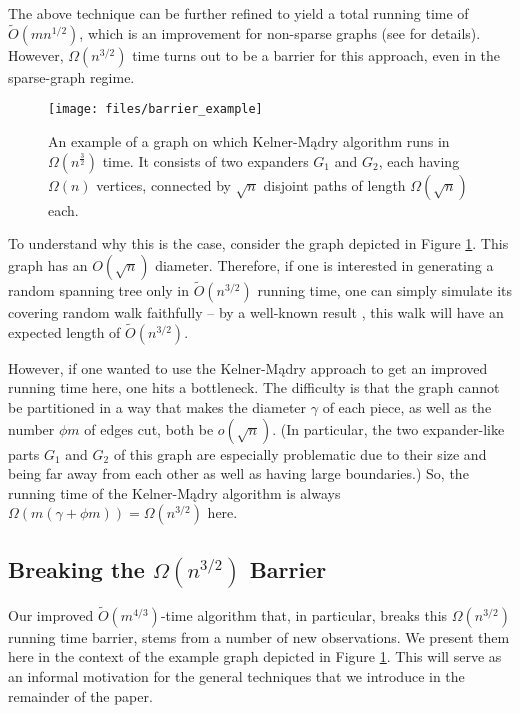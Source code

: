 \documentclass[11pt, letterpaper]{article}
\newcommand{\tO}{\widetilde{O}}
\begin{document}
The above technique can be further refined to yield a total running time of $\tO(mn^{1/2})$, which is an improvement for non-sparse graphs (see \cite{KelnerM09} for details). However, $\Omega(n^{3/2})$ time turns out to be a barrier for this approach, even in the sparse-graph regime. 

\begin{figure}[ht]
\centering
\vspace{8pt}
\texttt{[image: files/barrier\_example]}
\vspace{8pt}
\caption{An example of a graph on which Kelner-Mądry algorithm runs in $\Omega(n^{\frac{3}{2}})$ time. It consists of two expanders $G_1$ and $G_2$, each having $\Omega(n)$ vertices, connected by $\sqrt{n}$ disjoint paths of length $\Omega(\sqrt{n})$ each.} 
\label{fig:barrier_example}
\end{figure}


To understand why this is the case, consider the graph depicted in Figure \ref{fig:barrier_example}. This graph has an $O(\sqrt{n})$ diameter. Therefore, if one is interested in generating a random spanning tree only in $\tO(n^{3/2})$ running time, one can simply simulate its covering random walk faithfully -- by a well-known result \cite{AleliunasKLLR79}, this walk will have an expected length of $\tO(n^{3/2})$.

However, if one wanted to use the Kelner-Mądry approach to get an improved running time here, one hits a bottleneck. The difficulty is that the graph cannot be partitioned in a way that makes the diameter $\gamma$ of each piece, as well as the number $\phi m$ of edges cut, both be $o(\sqrt{n})$. (In particular, the two expander-like parts $G_1$ and $G_2$ of this graph are especially problematic due to their size and being far away from each other as well as having large boundaries.) So, the running time of the Kelner-Mądry algorithm is always $\Omega(m(\gamma+\phi m))=\Omega(n^{3/2})$ here.

\subsection{Breaking the $\Omega(n^{3/2})$ Barrier}

Our improved $\tO(m^{4/3})$-time algorithm that, in particular, breaks this $\Omega(n^{3/2})$ running time barrier, stems from a number of new observations. We present them here in the context of the example graph depicted in Figure \ref{fig:barrier_example}. This will serve as an informal motivation for the general techniques that we introduce in the remainder of the paper.
\end{document}
